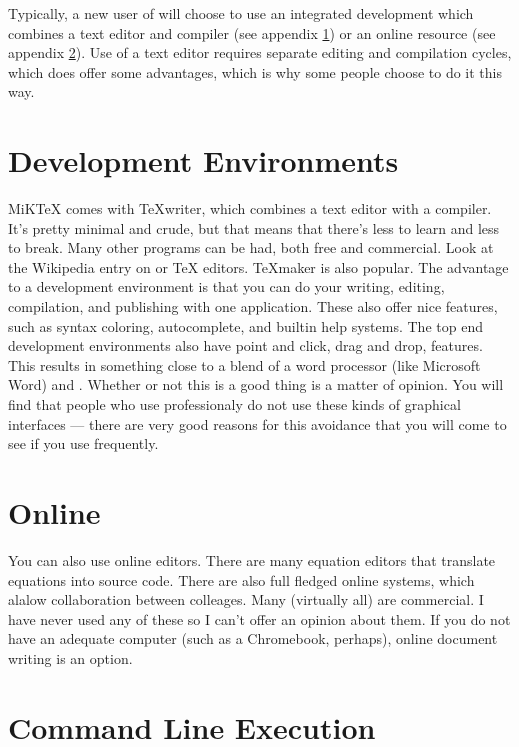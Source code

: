     Typically, a new user of \Lx{} will choose to use an integrated development which combines a text editor and compiler (see appendix \ref{Development Environments}) or an online resource (see appendix \ref{Online}). Use of a text editor requires separate editing and compilation cycles, which does offer some advantages, which is why some people choose to do it this way.

    \section{Development Environments}
    \label{Development Environments}

    MiKTeX comes with TeXwriter, which combines a text editor with a compiler. It's pretty minimal and crude, but that means that there's less to learn and less to break. Many other \Lx{} programs can be had, both free and commercial. Look at the Wikipedia entry on \Lx{} or \TeX{} editors. TeXmaker is also popular. The advantage to a development environment is that you can do your writing, editing, compilation, and publishing with one application. These also offer nice features, such as syntax coloring, autocomplete, and builtin help systems. The top end development environments also have point and click, drag and drop, features. This results in something close to a blend of a word processor (like Microsoft Word) and \Lx{}. Whether or not this is a good thing is a matter of opinion. You will find that people who use \Lx{} professionaly do not use these kinds of graphical interfaces --- there are very good reasons for this avoidance that you will come to see if you use \Lx{} frequently.

    \section{Online \LaTeXe}
    \label{Online}

    You can also use online \Lx{} editors. There are many equation editors that translate equations into \Lx{} source code. There are also full fledged online \Lx{} systems, which alalow collaboration between colleages. Many (virtually all) are commercial. I have never used any of these so I can't offer an opinion about them. If you do not have an adequate computer (such as a Chromebook, perhaps), online document writing is an option.

    \section{Command Line Execution}
    \label{Command Line}

